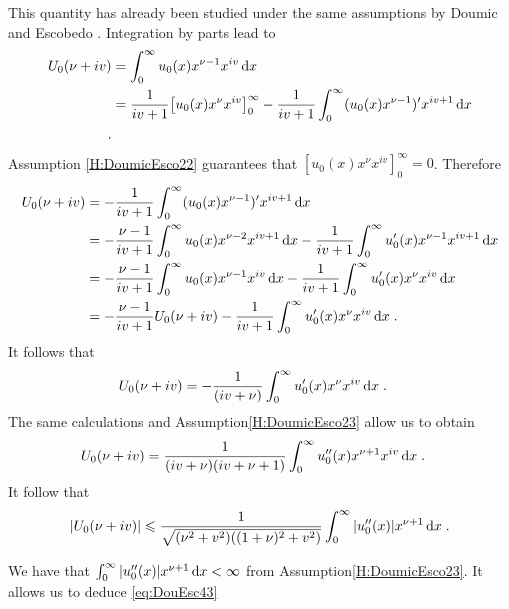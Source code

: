 This quantity has already been studied under the same assumptions by Doumic and Escobedo \cite{doumic2016time}. Integration by parts lead to 
    \begin{align*}
        U_0(\nu + i v) 
        &= \int_0^\infty u_0(x) x^{\nu-1}x^{i v}\, \mathrm dx \\
        &= \frac{1}{iv + 1} \big[ u_0(x) x^{\nu} x^{i v} \big]_0^\infty - \frac{1}{iv + 1} \int_0^\infty (u_0(x) x^{\nu-1})' x^{i v+1}\, \mathrm dx \\
        \; .
    \end{align*}
Assumption \eqref{H:DoumicEsco22} guarantees that $[ u_0(x) x^{\nu} x^{i v} ]_0^\infty = 0$. Therefore
    \begin{align*}
        U_0(\nu + i v) 
        &= - \frac{1}{iv + 1} \int_0^\infty (u_0(x) x^{\nu-1})' x^{i v+1}\, \mathrm dx \\
        &= - \frac{\nu - 1}{iv + 1} \int_0^\infty u_0(x) x^{\nu-2} x^{i v + 1}\, \mathrm dx  - \frac{1}{iv + 1} \int_0^\infty u_0'(x) x^{\nu-1} x^{i v + 1}\, \mathrm dx \\
        &= - \frac{\nu - 1}{iv + 1} \int_0^\infty u_0(x) x^{\nu-1} x^{i v}\, \mathrm dx  - \frac{1}{iv + 1} \int_0^\infty u_0'(x) x^{\nu} x^{i v}\, \mathrm dx \\
        &= - \frac{\nu - 1}{iv + 1} U_0(\nu + i v)   - \frac{1}{iv + 1} \int_0^\infty u_0'(x) x^{\nu} x^{i v}\, \mathrm dx
        \; .
    \end{align*}
It follows that 
    \begin{align*}
        U_0(\nu + i v)
        &= - \frac{1}{(iv + \nu)}\int_0^\infty u_0'(x) x^{\nu} x^{i v}\, \mathrm dx
        \; .
    \end{align*}
The same calculations and Assumption\eqref{H:DoumicEsco23} allow us to obtain 
    \begin{align*}
        U_0(\nu + i v)
        &=  \frac{1}{(iv + \nu)(iv + \nu + 1)}\int_0^\infty u_0''(x) x^{\nu + 1} x^{i v}\, \mathrm dx
        \; .
    \end{align*}
It follow that 
    \begin{equation*}
        |U_0(\nu + i v)| \leqslant \frac{1}{\sqrt{(\nu^2 + v^2)((1+\nu)^2 + v^2)}} \int_0^\infty |u_0''(x)| x^{\nu + 1} \, \mathrm dx
        \; .
    \end{equation*}

We have that $\int_0^\infty |u_0''(x)| x^{\nu + 1} \, \mathrm dx < \infty$ from Assumption\eqref{H:DoumicEsco23}. It allows us to deduce \eqref{eq:DouEsc43} \\

